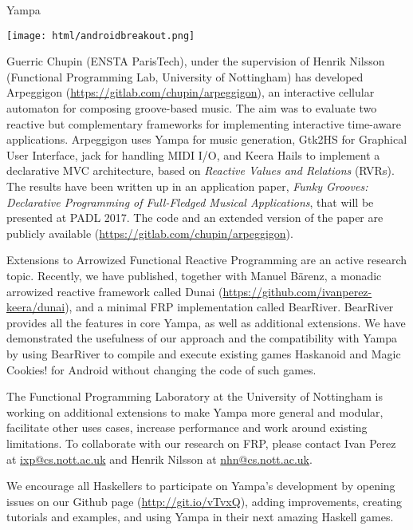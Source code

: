\begin{hcarentry}[updated]{Yampa}
\begin{center}
\texttt{[image: html/androidbreakout.png]}
\end{center}

Guerric Chupin (ENSTA ParisTech), under the supervision of Henrik Nilsson
(Functional Programming Lab, University of Nottingham) has developed Arpeggigon
(\href{https://gitlab.com/chupin/arpeggigon}{https://gitlab.com/chupin/arpeggigon}),
an interactive cellular automaton for composing groove-based music. The aim was
to evaluate two reactive but complementary frameworks for implementing
interactive time-aware applications. Arpeggigon uses Yampa for music
generation, Gtk2HS for Graphical User Interface, jack for handling MIDI I/O,
and Keera Hails to implement a declarative MVC architecture, based on
\emph{Reactive Values and Relations} (RVRs).  The results have been written up
in an application paper, \emph{Funky Grooves: Declarative Programming of
Full-Fledged Musical Applications}, that will be presented at PADL 2017. The
code and an extended version of the paper are publicly available
(\href{https://gitlab.com/chupin/arpeggigon}{https://gitlab.com/chupin/arpeggigon}).

Extensions to Arrowized Functional Reactive Programming are an active research
topic. Recently, we have published, together with Manuel B\"arenz, a
monadic arrowized reactive framework called Dunai
(\href{https://github.com/ivanperez-keera/dunai}{https://github.com/ivanperez-keera/dunai}),
and a minimal FRP implementation called BearRiver. BearRiver provides all the
features in core Yampa, as well as additional extensions. We have demonstrated
the usefulness of our approach and the compatibility with Yampa by using
BearRiver to compile and execute existing games Haskanoid and Magic Cookies!
for Android without changing the code of such games.

The Functional Programming Laboratory at the University of Nottingham is
working on additional extensions to make Yampa more general and modular,
facilitate other uses cases, increase performance and work around existing
limitations. To collaborate with our research on FRP, please contact Ivan Perez
at \href{mailto:ixp@cs.nott.ac.uk}{ixp@cs.nott.ac.uk} and Henrik Nilsson at
\href{mailto:nhn@cs.nott.ac.uk}{nhn@cs.nott.ac.uk}.

We encourage all Haskellers to participate on Yampa's development by opening
issues on our Github page (\href{http://git.io/vTvxQ}{http://git.io/vTvxQ}),
adding improvements, creating tutorials and examples, and using Yampa in their
next amazing Haskell games.


\end{hcarentry}

